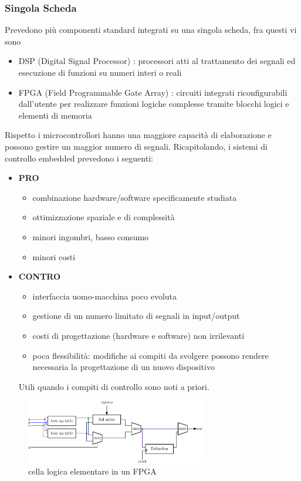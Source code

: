 \documentclass[10pt, letterpaper]{report}
\begin{document}
\subsubsection{Singola Scheda}
Prevedono più componenti standard integrati su una singola scheda, fra questi vi sono\begin{itemize}
    \item DSP (Digital Signal Processor) : processori atti al trattamento dei segnali ed esecuzione di funzioni su numeri interi o reali 
    \item FPGA (Field Programmable Gate Array) : circuiti integrati riconfigurabili dall'utente per realizzare 
    funzioni logiche complesse tramite blocchi logici e elementi di memoria
\end{itemize}
Rispetto i microcontrollori hanno una maggiore capacità di elaborazione e possono gestire un maggior numero 
di segnali.\acc 
Ricapitolando, i sistemi di controllo embedded prevedono i seguenti:\begin{itemize}
    \item \textbf{PRO}\begin{itemize}
        \item combinazione hardware/software specificamente studiata 
        \item ottimizzazione spaziale e di complessità
        \item minori ingombri, basso consumo 
        \item minori costi
    \end{itemize}
    \item \textbf{CONTRO}\begin{itemize}
        \item interfaccia uomo-macchina poco evoluta
        \item  gestione di un numero limitato di segnali in input/output 
        \item  costi di progettazione (hardware e software) non irrilevanti 
        \item poca flessibilità: modifiche ai compiti da svolgere possono 
        rendere necessaria la progettazione di un nuovo dispositivo 
    \end{itemize}
    Utili quando i compiti di controllo sono noti a priori.
\end{itemize}
\begin{figure}[h!]
    \centering
    \includegraphics[width=0.7\textwidth ]{images/cellaLogica.eps}
    \caption{cella logica elementare in un FPGA}
\end{figure}
\end{document}
